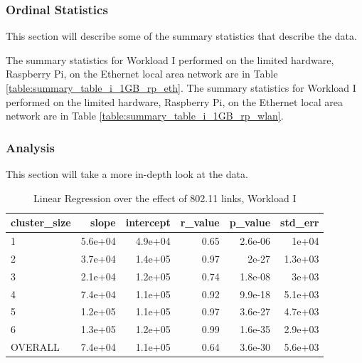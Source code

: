 \subsubsection{Ordinal Statistics}
This section will describe some of the summary statistics that describe the data.  

The summary statistics for Workload I performed on the limited hardware, Raspberry Pi, on the Ethernet local area network are in Table \ref{table:summary_table_i_1GB_rp_eth}.
The summary statistics for Workload I performed on the limited hardware, Raspberry Pi, on the Ethernet local area network are in Table \ref{table:summary_table_i_1GB_rp_wlan}.



\subsubsection{Analysis}
This section will take a more in-depth look at the data.




\begin{table}[H]
\centering
\begin{tabular}{lrrrrr}
\toprule
cluster\_size &   slope &  intercept &  r\_value &  p\_value &  std\_err \\
\midrule
           1 & 5.6e+04 &    4.9e+04 &     0.65 &  2.6e-06 &    1e+04 \\
           2 & 3.7e+04 &    1.4e+05 &     0.97 &    2e-27 &  1.3e+03 \\
           3 & 2.1e+04 &    1.2e+05 &     0.74 &  1.8e-08 &    3e+03 \\
           4 & 7.4e+04 &    1.1e+05 &     0.92 &  9.9e-18 &  5.1e+03 \\
           5 & 1.2e+05 &    1.1e+05 &     0.97 &  3.6e-27 &  4.7e+03 \\
           6 & 1.3e+05 &    1.2e+05 &     0.99 &  1.6e-35 &  2.9e+03 \\
     OVERALL & 7.4e+04 &    1.1e+05 &     0.64 &  3.6e-30 &  5.6e+03 \\
\bottomrule
\end{tabular}
\caption{Linear Regression over the effect of 802.11 links, Workload I}
\label{table:wlan_v_eth_i}
\end{table}





